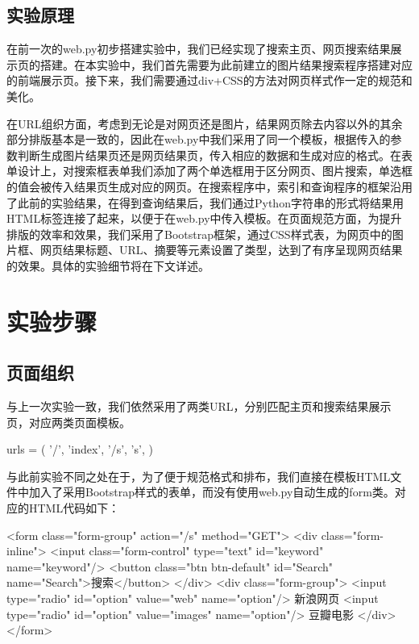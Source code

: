 \documentclass{article}
\begin{document}
\subsection{实验原理}

在前一次的web.py初步搭建实验中，我们已经实现了搜索主页、网页搜索结果展示页的搭建。在本实验中，我们首先需要为此前建立的图片结果搜索程序搭建对应的前端展示页。接下来，我们需要通过div+CSS的方法对网页样式作一定的规范和美化。

在URL组织方面，考虑到无论是对网页还是图片，结果网页除去内容以外的其余部分排版基本是一致的，因此在web.py中我们采用了同一个模板，根据传入的参数判断生成图片结果页还是网页结果页，传入相应的数据和生成对应的格式。在表单设计上，对搜索框表单我们添加了两个单选框用于区分网页、图片搜索，单选框的值会被传入结果页生成对应的网页。在搜索程序中，索引和查询程序的框架沿用了此前的实验结果，在得到查询结果后，我们通过Python字符串的形式将结果用HTML标签连接了起来，以便于在web.py中传入模板。在页面规范方面，为提升排版的效率和效果，我们采用了Bootstrap框架，通过CSS样式表，为网页中的图片框、网页结果标题、URL、摘要等元素设置了类型，达到了有序呈现网页结果的效果。具体的实验细节将在下文详述。

\section{实验步骤}

\subsection{页面组织}

与上一次实验一致，我们依然采用了两类URL，分别匹配主页和搜索结果展示页，对应两类页面模板。
\begin{python}
urls = (
    '/', 'index',
    '/s', 's',
)
\end{python}

与此前实验不同之处在于，为了便于规范格式和排布，我们直接在模板HTML文件中加入了采用Bootstrap样式的表单，而没有使用web.py自动生成的form类。对应的HTML代码如下：
\begin{python}
<form class="form-group" action="/s" method="GET">
	<div class="form-inline">
			<input class="form-control" type="text" id="keyword" name="keyword"/>
			<button class="btn btn-default" id="Search" name="Search">搜索</button>
	</div>
	<div class="form-group">
		<input type="radio" id="option" value="web" name="option"/> 新浪网页
		<input type="radio" id="option" value="images" name="option"/> 豆瓣电影
	</div>
</form>
\end{python}
\end{document}

